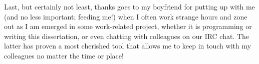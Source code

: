 Last, but certainly not least, thanks goes to my boyfriend for putting up with
me (and no less important; feeding me!) when I often work strange hours and zone
out as I am emerged in some work-related project, whether it is programming or
writing this dissertation, or even chatting with colleagues on our IRC chat.
The latter has proven a most cherished tool that allows me to keep in touch
with my colleagues no matter the time or place!

